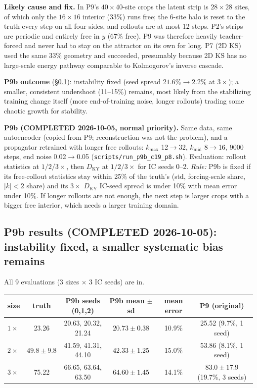 \documentclass[11pt]{article}
\begin{document}
\textbf{Likely cause and fix.} In P9's $40\times40$-site crops the
latent strip is $28\times28$ sites, of which only the $16\times16$
interior (33\%) runs free; the 6-site halo is reset to the truth every
step on all four sides, and rollouts are at most 12 steps. P2's strips
are periodic and entirely free in $y$ (67\% free). P9 was therefore
heavily teacher-forced and never had to stay on the attractor on its own
for long. P7 (2D KS) used the same 33\% geometry and succeeded,
presumably because 2D KS has no large-scale energy pathway comparable
to Kolmogorov's inverse cascade.

\textbf{P9b outcome} (\S\ref{sec:p9b_results}): instability fixed (seed
spread $21.6\%\to2.2\%$ at $3\times$); a smaller, consistent
undershoot (11--15\%) remains, most likely from the stabilizing
training change itself (more end-of-training noise, longer rollouts)
trading some chaotic growth for stability.

\textbf{P9b (COMPLETED 2026-10-05, normal priority).} Same data, same
autoencoder (copied from P9; reconstruction was not the problem), and a
propagator retrained with longer free rollouts: $k_{\max}$ 12$\to$32,
$k_{\mathrm{mid}}$ 8$\to$16, 9000 steps, end noise 0.02$\to$0.05
(\texttt{scripts/run\_p9b\_c19\_p8.sh}). Evaluation: rollout statistics
at $1/2/3\times$, then $D_{\mathrm{KY}}$ at $1/2/3\times$ for IC seeds
0--2. \emph{Rule:} P9b is fixed if its free-rollout statistics stay
within 25\% of the truth's (std, forcing-scale share, $|k|<2$ share) and
its $3\times$ $D_{\mathrm{KY}}$ IC-seed spread is under 10\% with mean
error under 10\%. If longer rollouts are not enough, the next step is
larger crops with a bigger free interior, which needs a larger training
domain.

\subsection{P9b results (COMPLETED 2026-10-05): instability fixed, a smaller systematic bias remains}
\label{sec:p9b_results}

All 9 evaluations (3 sizes $\times$ 3 IC seeds) are in.

\begin{center}
\small
\begin{tabular}{lccccc}
\toprule
size & truth & P9b seeds (0,1,2) & P9b mean $\pm$ sd & mean error & P9 (original) \\
\midrule
$1\times$ & 23.26 & 20.63, 20.32, 21.24 & $20.73\pm0.38$ & 10.9\% & 25.52 (9.7\%, 1 seed) \\
$2\times$ & $49.8\pm9.8$ & 41.59, 41.31, 44.10 & $42.33\pm1.25$ & 15.0\% & 53.86 (8.1\%, 1 seed) \\
$3\times$ & 75.22 & 66.65, 63.64, 63.50 & $64.60\pm1.45$ & 14.1\% & $83.0\pm17.9$ (19.7\%, 3 seeds) \\
\bottomrule
\end{tabular}
\end{center}
\end{document}
